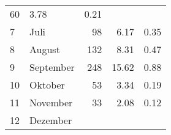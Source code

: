 \begin{longtable}{lXrrr}
       \num{60} &
       \num[round-mode=places,round-precision=2]{3.78} &
         \num[round-mode=places,round-precision=2]{0.21} \\

     7 &
     \multicolumn{1}{X}{ Juli   } &


       \num{98} &
       \num[round-mode=places,round-precision=2]{6.17} &
         \num[round-mode=places,round-precision=2]{0.35} \\

     8 &
     \multicolumn{1}{X}{ August   } &


       \num{132} &
       \num[round-mode=places,round-precision=2]{8.31} &
         \num[round-mode=places,round-precision=2]{0.47} \\

     9 &
     \multicolumn{1}{X}{ September   } &


       \num{248} &
       \num[round-mode=places,round-precision=2]{15.62} &
         \num[round-mode=places,round-precision=2]{0.88} \\

     10 &
     \multicolumn{1}{X}{ Oktober   } &


       \num{53} &
       \num[round-mode=places,round-precision=2]{3.34} &
         \num[round-mode=places,round-precision=2]{0.19} \\

     11 &
     \multicolumn{1}{X}{ November   } &


       \num{33} &
       \num[round-mode=places,round-precision=2]{2.08} &
         \num[round-mode=places,round-precision=2]{0.12} \\

     12 &
     \multicolumn{1}{X}{ Dezember   } &



\end{longtable}
